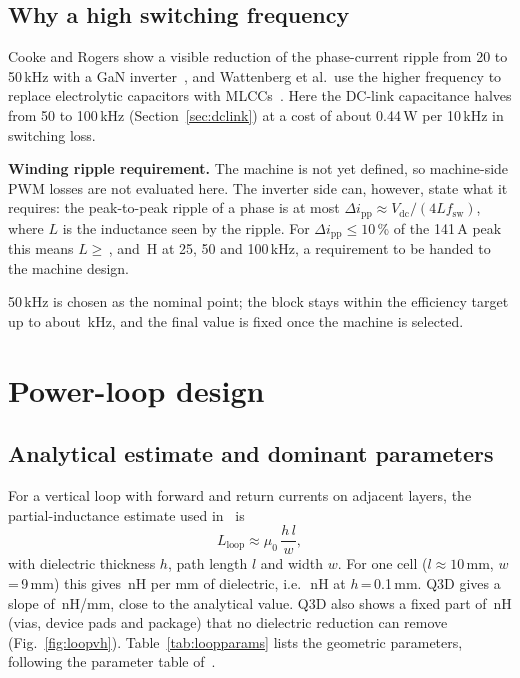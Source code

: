 \documentclass[10pt,a4paper]{article}
\begin{document}
\subsection{Why a high switching frequency}
Cooke and Rogers show a visible reduction of the phase-current ripple from 20 to 50\,kHz with a GaN inverter~\cite{cooke2026}, and Wattenberg et al.\ use the higher frequency to replace electrolytic capacitors with MLCCs~\cite{wattenberg2023}.
Here the DC-link capacitance halves from 50 to 100\,kHz (Section~\ref{sec:dclink}) at a cost of about 0.44\,W per 10\,kHz in switching loss.

\textbf{Winding ripple requirement.} The machine is not yet defined, so machine-side PWM losses are not evaluated here. The inverter side can, however, state what it requires: the peak-to-peak ripple of a phase is at most $\Delta i_\mathrm{pp}\approx V_\mathrm{dc}/(4L f_\mathrm{sw})$, where $L$ is the inductance seen by the ripple. For $\Delta i_\mathrm{pp}\leq10$\,\% of the 141\,A peak this means $L\geq$\,\LreqTwentyFive, \LreqFifty{} and \LreqHundred\,\textmu H at 25, 50 and 100\,kHz, a requirement to be handed to the machine design.

50\,kHz is chosen as the nominal point; the block stays within the efficiency target up to about \Fmax\,kHz, and the final value is fixed once the machine is selected.

\section{Power-loop design}\label{sec:loop}
\subsection{Analytical estimate and dominant parameters}
For a vertical loop with forward and return currents on adjacent layers, the partial-inductance estimate used in~\cite{cooke2026,tran2025} is
\begin{equation}
L_\mathrm{loop}\approx\mu_0\,\frac{h\,l}{w},
\end{equation}
with dielectric thickness $h$, path length $l$ and width $w$.
For one cell ($l\approx10$\,mm, $w$\,=\,9\,mm) this gives \KanNHmm\,nH per mm of dielectric, i.e.\ \LanCell\,nH at $h$\,=\,0.1\,mm.
Q3D gives a slope of \KqNHmm\,nH/mm, close to the analytical value. Q3D also shows a fixed part of \LfixNH\,nH (vias, device pads and package) that no dielectric reduction can remove (Fig.~\ref{fig:loopvh}).
Table~\ref{tab:loopparams} lists the geometric parameters, following the parameter table of~\cite{tran2025}.
\end{document}
